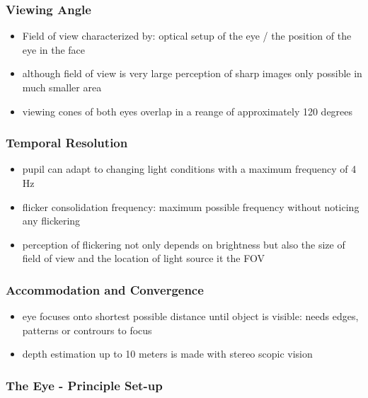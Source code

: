 \documentclass{standalone}
\begin{document}
\subsubsection{Viewing Angle}
\begin{itemize}
	\item Field of view characterized by: optical setup of the eye / the position of the eye in the face
	\item although field of view is very large perception of sharp images only possible in much smaller area
	\item viewing cones of both eyes overlap in a reange of approximately 120 degrees
\end{itemize}
\subsubsection{Temporal Resolution}
\begin{itemize}
	\item pupil can adapt to changing light conditions with a maximum frequency of 4 Hz	
	\item flicker consolidation frequency: maximum possible frequency without noticing any flickering
	\item perception of flickering not only depends on brightness but also the size of field of view and the location of light source it the FOV
\end{itemize}
\subsubsection{Accommodation and Convergence}
\begin{itemize}
	\item eye focuses onto shortest possible distance until object is visible: needs edges, patterns or contrours to focus
	\item depth estimation up to 10 meters is made with stereo scopic vision
\end{itemize}
\subsubsection{The Eye - Principle Set-up}
\end{document}
